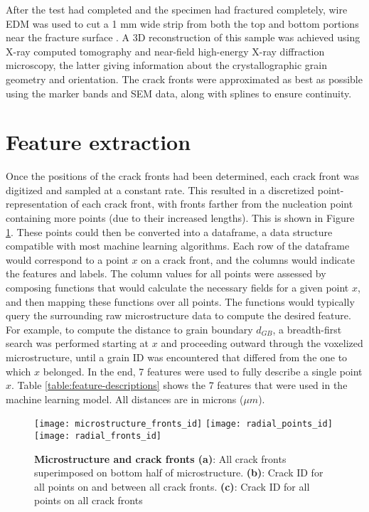 After the test had completed and the specimen had fractured completely, wire EDM was used to cut a 1 mm wide strip from both the top and bottom portions near the fracture surface \cite{spear2014}.  A 3D reconstruction of this sample was achieved using X-ray computed tomography and near-field high-energy X-ray diffraction microscopy, the latter giving information about the crystallographic grain geometry and orientation.  The crack fronts were approximated as best as possible using the marker bands and SEM data, along with splines to ensure continuity.

\section{Feature extraction}
Once the positions of the crack fronts had been determined, each crack front was digitized and sampled at a constant rate.  This resulted in a discretized point-representation of each crack front, with fronts farther from the nucleation point containing more points (due to their increased lengths).  This is shown in Figure \ref{fig:crack_fronts}.  These points could then be converted into a dataframe, a data structure compatible with most machine learning algorithms.  Each row of the dataframe would correspond to a point $x$ on a crack front, and the columns would indicate the features and labels.  The column values for all points were assessed by composing functions that would calculate the necessary fields for a given point $x$, and then mapping these functions over all points.  The functions would typically query the surrounding raw microstructure data to compute the desired feature.  For example, to compute the distance to grain boundary $d_{GB}$, a breadth-first search was performed starting at $x$ and proceeding outward through the voxelized microstructure, until a grain ID was encountered that differed from the one to which $x$ belonged.  In the end, 7 features were used to fully describe a single point $x$.  Table \ref{table:feature-descriptions} shows the 7 features that were used in the machine learning model.  All distances are in microns ($\mu m$).

\begin{figure}[p]
  \centering
    \texttt{[image: microstructure\_fronts\_id]}
    \texttt{[image: radial\_points\_id]}
    \texttt{[image: radial\_fronts\_id]}

    \caption{\textbf{Microstructure and crack fronts (a)}: All crack fronts superimposed on bottom half of microstructure.
             \textbf{(b)}: Crack ID for all points on and between all crack fronts.
             \textbf{(c)}: Crack ID for all points on all crack fronts}
  \label{fig:crack_fronts}
\end{figure}

